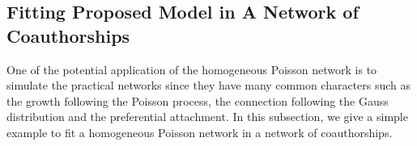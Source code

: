 \documentclass[final]{IEEEtran}
\begin{document}
%
%



\subsection{Fitting Proposed Model in A Network of Coauthorships}
One of the potential application of the homogeneous Poisson
network is to simulate the practical networks since they have many
common characters such as the growth following the Poisson
process, the connection following the Gauss distribution and the
preferential attachment. In this subsection, we give a simple
example to fit a homogeneous Poisson network in a network of
coauthorships.
\end{document}
